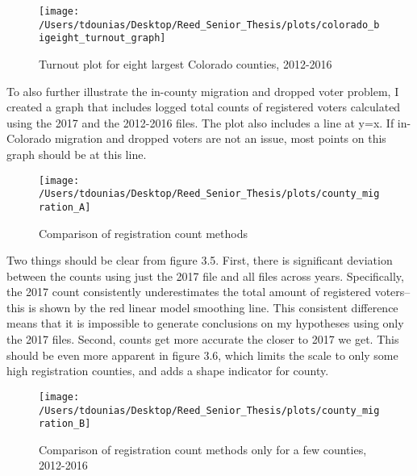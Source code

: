 \documentclass[12pt,twoside]{reedthesis}
\begin{document}
  \begin{figure}
  
  {\centering \texttt{[image: /Users/tdounias/Desktop/Reed\_Senior\_Thesis/plots/colorado\_bigeight\_turnout\_graph]} 
  
  }
  
  \caption[Turnout plot for eight largest Colorado counties, 2012-2016]{Turnout plot for eight largest Colorado counties, 2012-2016}\label{fig:big eight turnout plot}
  \end{figure}
  
  To also further illustrate the in-county migration and dropped voter
  problem, I created a graph that includes logged total counts of
  registered voters calculated using the 2017 and the 2012-2016 files. The
  plot also includes a line at y=x. If in-Colorado migration and dropped
  voters are not an issue, most points on this graph should be at this
  line.
  
  \begin{figure}
  
  {\centering \texttt{[image: /Users/tdounias/Desktop/Reed\_Senior\_Thesis/plots/county\_migration\_A]} 
  
  }
  
  \caption[Comparison of registration count methods]{Comparison of registration count methods}\label{fig:county migration A}
  \end{figure}
  
  Two things should be clear from figure 3.5. First, there is significant
  deviation between the counts using just the 2017 file and all files
  across years. Specifically, the 2017 count consistently underestimates
  the total amount of registered voters--this is shown by the red linear
  model smoothing line. This consistent difference means that it is
  impossible to generate conclusions on my hypotheses using only the 2017
  files. Second, counts get more accurate the closer to 2017 we get. This
  should be even more apparent in figure 3.6, which limits the scale to
  only some high registration counties, and adds a shape indicator for
  county.
  
  \begin{figure}
  
  {\centering \texttt{[image: /Users/tdounias/Desktop/Reed\_Senior\_Thesis/plots/county\_migration\_B]} 
  
  }
  
  \caption[Comparison of registration count methods only for a few counties, 2012-2016]{Comparison of registration count methods only for a few counties, 2012-2016}\label{fig:county migration B}
  \end{figure}
  
\end{document}
